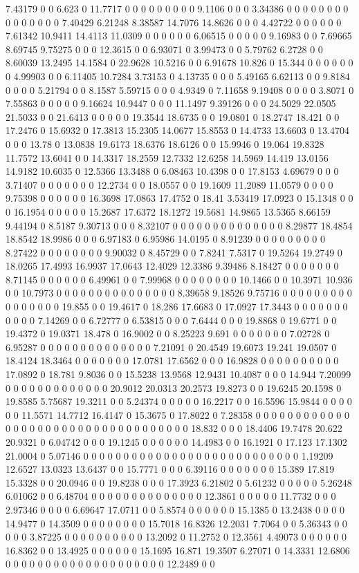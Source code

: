 7.43179 0 0 6.623 0 11.7717 0 0 0 0 0 0 0 0 0 9.1106 0 0 0 3.34386 0 0 0 0 0 0 0 0 0 0 0 0 0 0 0 7.40429 6.21248 8.38587 14.7076 14.8626 0 0 0 4.42722 0 0 0 0 0 0 7.61342 10.9411 14.4113 11.0309 0 0 0 0 0 0 6.06515 0 0 0 0 0 9.16983 0 0 7.69665 8.69745 9.75275 0 0 0 12.3615 0 0 6.93071 0 3.99473 0 0 5.79762 6.2728 0 0 8.60039 13.2495 14.1584 0 22.9628 10.5216 0 0 6.91678 10.826 0 15.344 0 0 0 0 0 0 0 4.99903 0 0 6.11405 10.7284 3.73153 0 4.13735 0 0 0 5.49165 6.62113 0 0 9.8184 0 0 0 0 5.21794 0 0 8.1587 5.59715 0 0 0 4.9349 0 7.11658 9.19408 0 0 0 0 3.8071 0 7.55863 0 0 0 0 0 9.16624 10.9447 0 0 0 11.1497 9.39126 0 0 0 24.5029 22.0505 21.5033 0 0 21.6413 0 0 0 0 0 19.3544 18.6735 0 0 19.0801 0 18.2747 18.421 0 0 17.2476 0 15.6932 0 17.3813 15.2305 14.0677 15.8553 0 14.4733 13.6603 0 13.4704 0 0 0 13.78 0 13.0838 19.6173 18.6376 18.6126 0 0 15.9946 0 19.064 19.8328 11.7572 13.6041 0 0 14.3317 18.2559 12.7332 12.6258 14.5969 14.419 13.0156 14.9182 10.6035 0 12.5366 13.3488 0 6.08463 10.4398 0 0 17.8153 4.69679 0 0 0 3.71407 0 0 0 0 0 0 0 12.2734 0 0 18.0557 0 0 19.1609 11.2089 11.0579 0 0 0 0 9.75398 0 0 0 0 0 0 16.3698 17.0863 17.4752 0 18.41 3.53419 17.0923 0 15.1348 0 0 0 16.1954 0 0 0 0 0 15.2687 17.6372 18.1272 19.5681 14.9865 13.5365 8.66159 9.44194 0 8.5187 9.30713 0 0 0 8.32107 0 0 0 0 0 0 0 0 0 0 0 0 0 0 8.29877 18.4854 18.8542 18.9986 0 0 0 6.97183 0 6.95986 14.0195 0 8.91239 0 0 0 0 0 0 0 0 0 8.27422 0 0 0 0 0 0 0 0 9.90032 0 8.45729 0 0 7.8241 7.5317 0 19.5264 19.2749 0 18.0265 17.4993 16.9937 17.0643 12.4029 12.3386 9.39486 8.18427 0 0 0 0 0 0 0 8.71145 0 0 0 0 0 0 6.49961 0 0 7.99968 0 0 0 0 0 0 0 0 10.1466 0 0 10.3971 10.936 0 0 10.7973 0 0 0 0 0 0 0 0 0 0 0 0 0 0 0 8.39658 9.18526 9.75716 0 0 0 0 0 0 0 0 0 0 0 0 0 0 0 0 19.855 0 0 19.4617 0 18.286 17.6683 0 17.0927 17.3443 0 0 0 0 0 0 0 0 0 0 0 7.14269 0 0 6.72777 0 6.53815 0 0 0 7.6444 0 0 0 19.8868 0 19.6771 0 0 19.4372 0 19.0371 18.478 0 16.9002 0 0 8.25223 9.691 0 0 0 0 0 0 0 7.02728 0 6.95287 0 0 0 0 0 0 0 0 0 0 0 0 0 0 7.21091 0 20.4549 19.6073 19.241 19.0507 0 18.4124 18.3464 0 0 0 0 0 0 0 17.0781 17.6562 0 0 0 16.9828 0 0 0 0 0 0 0 0 0 0 17.0892 0 18.781 9.8036 0 0 15.5238 13.9568 12.9431 10.4087 0 0 0 14.944 7.20099 0 0 0 0 0 0 0 0 0 0 0 0 0 20.9012 20.0313 20.2573 19.8273 0 0 19.6245 20.1598 0 19.8585 5.75687 19.3211 0 0 5.24374 0 0 0 0 0 16.2217 0 0 16.5596 15.9844 0 0 0 0 0 0 11.5571 14.7712 16.4147 0 15.3675 0 17.8022 0 7.28358 0 0 0 0 0 0 0 0 0 0 0 0 0 0 0 0 0 0 0 0 0 0 0 0 0 0 0 0 0 0 0 0 0 0 0 18.832 0 0 0 18.4406 19.7478 20.622 20.9321 0 6.04742 0 0 0 19.1245 0 0 0 0 0 0 14.4983 0 0 16.1921 0 17.123 17.1302 21.0004 0 5.07146 0 0 0 0 0 0 0 0 0 0 0 0 0 0 0 0 0 0 0 0 0 0 0 0 0 0 0 1.19209 12.6527 13.0323 13.6437 0 0 15.7771 0 0 0 6.39116 0 0 0 0 0 0 0 15.389 17.819 15.3328 0 0 20.0946 0 0 19.8238 0 0 0 17.3923 6.21802 0 5.61232 0 0 0 0 0 5.26248 6.01062 0 0 6.48704 0 0 0 0 0 0 0 0 0 0 0 0 0 0 12.3861 0 0 0 0 0 11.7732 0 0 0 2.97346 0 0 0 0 6.69647 17.0711 0 0 5.8574 0 0 0 0 0 0 15.1385 0 13.2438 0 0 0 0 14.9477 0 14.3509 0 0 0 0 0 0 0 0 15.7018 16.8326 12.2031 7.7064 0 0 5.36343 0 0 0 0 0 3.87225 0 0 0 0 0 0 0 0 0 0 13.2092 0 11.2752 0 12.3561 4.49073 0 0 0 0 0 0 16.8362 0 0 13.4925 0 0 0 0 0 0 15.1695 16.871 19.3507 6.27071 0 14.3331 12.6806 0 0 0 0 0 0 0 0 0 0 0 0 0 0 0 0 0 0 0 0 12.2489 0 0 